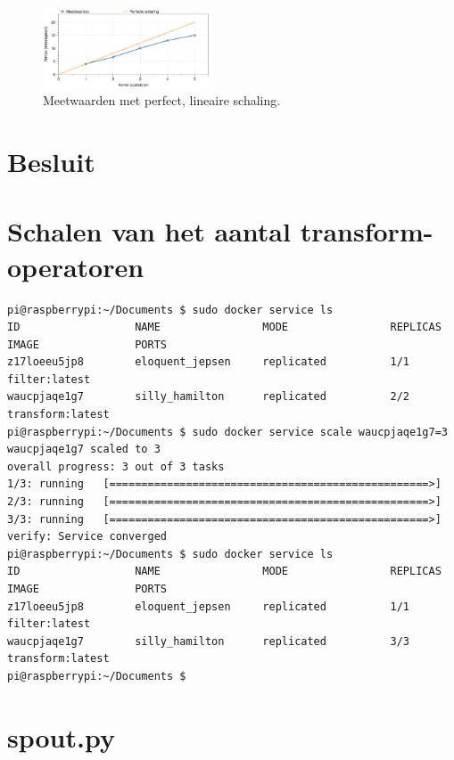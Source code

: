 \documentclass[twocolumn, a4paper]{article}
\begin{document}
\begin{figure}[htb]
    \centering
    \includegraphics[width=0.45\textwidth]{metingen}
    \caption{Meetwaarden met perfect, lineaire schaling.}\label{fig:metingen}
\end{figure}

\section{Besluit}
\onecolumn

\appendix
\section{Schalen van het aantal transform-operatoren}\label{appendix:schalen}
\begin{verbatim}
pi@raspberrypi:~/Documents $ sudo docker service ls
ID                  NAME                MODE                REPLICAS            IMAGE               PORTS
z17loeeu5jp8        eloquent_jepsen     replicated          1/1                 filter:latest       
waucpjaqe1g7        silly_hamilton      replicated          2/2                 transform:latest    
pi@raspberrypi:~/Documents $ sudo docker service scale waucpjaqe1g7=3
waucpjaqe1g7 scaled to 3
overall progress: 3 out of 3 tasks 
1/3: running   [==================================================>] 
2/3: running   [==================================================>] 
3/3: running   [==================================================>] 
verify: Service converged 
pi@raspberrypi:~/Documents $ sudo docker service ls
ID                  NAME                MODE                REPLICAS            IMAGE               PORTS
z17loeeu5jp8        eloquent_jepsen     replicated          1/1                 filter:latest       
waucpjaqe1g7        silly_hamilton      replicated          3/3                 transform:latest    
pi@raspberrypi:~/Documents $ 
\end{verbatim}


\section{spout.py}
\inputminted[breaklines=true]{python}{code/spout.py}
\end{document}
